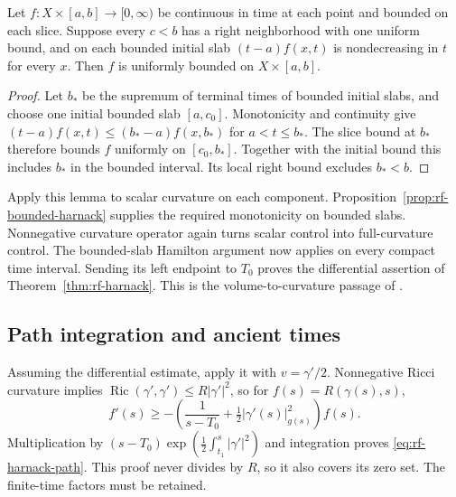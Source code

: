 \begin{lemma}
\label{lem:rf-slab-bound}
Let $f:X\times[a,b]\to[0,\infty)$ be continuous in time at each
point and bounded on each slice. Suppose every $c<b$ has a
right neighborhood with one uniform bound, and on each bounded
initial slab $(t-a)f(x,t)$ is nondecreasing in $t$ for every $x$.
Then $f$ is uniformly bounded on $X\times[a,b]$.
\end{lemma}
\begin{proof}
Let $b_*$ be the supremum of terminal times of bounded initial
slabs, and choose one initial bounded slab $[a,c_0]$.
Monotonicity and continuity give
$(t-a)f(x,t)\leq(b_*-a)f(x,b_*)$ for $a<t\leq b_*$.
The slice bound at $b_*$ therefore bounds $f$ uniformly on
$[c_0,b_*]$. Together with the initial bound this includes $b_*$
in the bounded interval. Its local right bound excludes $b_*<b$.
\end{proof}

Apply this lemma to scalar curvature on each component.
Proposition~\ref{prop:rf-bounded-harnack} supplies the required
monotonicity on bounded slabs. Nonnegative curvature operator
again turns scalar control into full-curvature control. The
bounded-slab Hamilton argument now applies on every compact time
interval. Sending its left endpoint to $T_0$ proves the
differential assertion of Theorem~\ref{thm:rf-harnack}.
This is the volume-to-curvature passage of
\cite[Theorem 4.2 and Corollary 4.4, pp.~3160--3161]{CabezasRivasWilking2015}.

\subsection{Path integration and ancient times}

Assuming the differential estimate, apply it with $v=\gamma'/2$.
Nonnegative Ricci curvature implies
$\operatorname{Ric}(\gamma',\gamma')\leq R|\gamma'|^2$, so
for $f(s)=R(\gamma(s),s)$,
\[
 f'(s)\geq-\left(\frac1{s-T_0}
                       +\tfrac12|\gamma'(s)|^2_{g(s)}\right)f(s).
\]
Multiplication by
$(s-T_0)\exp(\tfrac12\int_{t_1}^s|\gamma'|^2)$ and integration proves
\eqref{eq:rf-harnack-path}.  This proof never divides by $R$, so it
also covers its zero set.  The finite-time factors must be retained.

